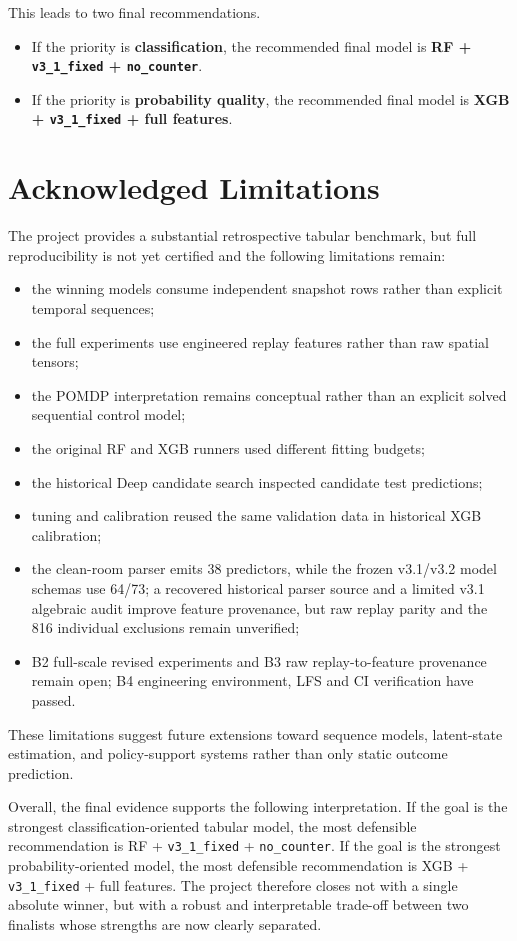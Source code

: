 \documentclass[11pt,a4paper]{article}
\begin{document}
This leads to two final recommendations.
\begin{itemize}
    \item If the priority is \textbf{classification}, the recommended final model is \textbf{RF + \texttt{v3\_1\_fixed} + \texttt{no\_counter}}.
    \item If the priority is \textbf{probability quality}, the recommended final model is \textbf{XGB + \texttt{v3\_1\_fixed} + full features}.
\end{itemize}

\section*{Acknowledged Limitations}
The project provides a substantial retrospective tabular benchmark, but full reproducibility is not yet certified and the following limitations remain:
\begin{itemize}
    \item the winning models consume independent snapshot rows rather than explicit temporal sequences;
    \item the full experiments use engineered replay features rather than raw spatial tensors;
    \item the POMDP interpretation remains conceptual rather than an explicit solved sequential control model;
    \item the original RF and XGB runners used different fitting budgets;
    \item the historical Deep candidate search inspected candidate test predictions;
    \item tuning and calibration reused the same validation data in historical XGB calibration;
    \item the clean-room parser emits 38 predictors, while the frozen v3.1/v3.2 model schemas use 64/73; a recovered historical parser source and a limited v3.1 algebraic audit improve feature provenance, but raw replay parity and the 816 individual exclusions remain unverified;
    \item B2 full-scale revised experiments and B3 raw replay-to-feature provenance remain open; B4 engineering environment, LFS and CI verification have passed.
\end{itemize}

These limitations suggest future extensions toward sequence models, latent-state estimation, and policy-support systems rather than only static outcome prediction.

Overall, the final evidence supports the following interpretation. If the goal is the strongest classification-oriented tabular model, the most defensible recommendation is RF + \texttt{v3\_1\_fixed} + \texttt{no\_counter}. If the goal is the strongest probability-oriented model, the most defensible recommendation is XGB + \texttt{v3\_1\_fixed} + full features. The project therefore closes not with a single absolute winner, but with a robust and interpretable trade-off between two finalists whose strengths are now clearly separated.
\end{document}
